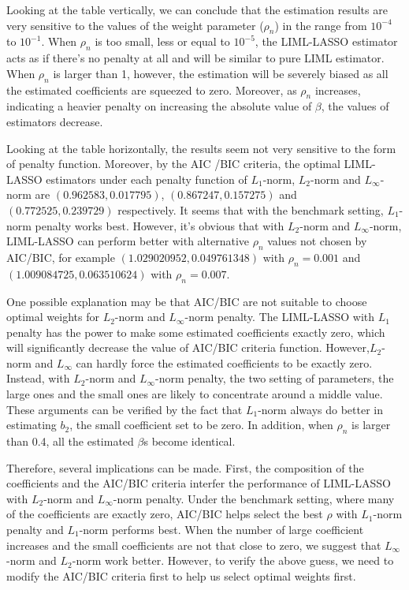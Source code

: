 \documentclass[12pt,pdftex,letterpaper]{article}
\begin{document}
\indent Looking at the table vertically, we can conclude that the estimation results are very sensitive to the values of the weight parameter ($\rho_{n}$) in the range from $10^{-4}$ to $10^{-1}$. When $\rho_{n}$ is too small, less or equal to $10^{-5}$, the LIML-LASSO estimator acts as if there's no penalty at all and will be similar to pure LIML estimator.   When $\rho_{n}$ is larger than 1, however, the estimation will be severely biased as all the estimated coefficients are squeezed to zero. Moreover, as $\rho_{n}$ increases, indicating a heavier penalty on increasing the absolute value of $\beta$, the values of estimators decrease. 

\indent Looking at the table horizontally, the results seem not very sensitive to the form of penalty function.  Moreover, by the AIC /BIC criteria, the optimal LIML-LASSO estimators under each penalty function of $L_{1}$-norm, $L_{2}$-norm and $L_{\infty}$-norm  are $(0.962583, 0.017795)$, $(0.867247, 0.157275)$ and $(0.772525, 0.239729)$ respectively. It seems that with the benchmark setting, $L_{1}$-norm  penalty works best. However, it's obvious that with $L_{2}$-norm and $L_{\infty}$-norm, LIML-LASSO can perform better with alternative $\rho_{n}$ values not chosen by AIC/BIC, for example $(1.029020952,0.049761348)$ with $\rho_{n}=0.001$ and $(1.009084725,0.063510624)$ with $\rho_{n}=0.007$. 

\indent One possible explanation may be that AIC/BIC are not suitable to choose optimal weights for $L_{2}$-norm and $L_{\infty}$-norm penalty. The LIML-LASSO with $L_{1}$ penalty has the power to make some estimated coefficients exactly zero, which will significantly decrease the value of AIC/BIC criteria function.  However,$L_{2}$-norm and $L_{\infty}$ can hardly force the estimated  coefficients to be exactly zero. Instead, with $L_{2}$-norm and $L_{\infty}$-norm penalty, the two setting of parameters, the large ones and the small ones are likely to concentrate around a middle value.  These arguments can be verified by the fact that $L_{1}$-norm always do better in estimating $b_{2}$, the small coefficient set to be zero. In addition, when  $\rho_{n}$ is larger than 0.4, all the estimated $\beta$s become identical.

\indent Therefore, several  implications can be made. First, the composition of the coefficients and the AIC/BIC criteria interfer the performance of LIML-LASSO with $L_{2}$-norm and $L_{\infty}$-norm penalty. Under the benchmark setting, where many of the coefficients are exactly zero, AIC/BIC helps select the best $\rho$ with $L_{1}$-norm penalty and $L_{1}$-norm performs best. When the number of large coefficient increases and the small coefficients are not that close to zero, we  suggest that $L_{\infty}$-norm and $L_{2}$-norm work better. However, to verify the above guess, we need to modify the AIC/BIC criteria first to help us select optimal weights first.
\end{document}
